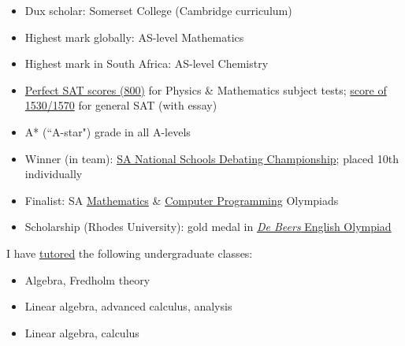 \documentclass[10pt,a4paper,ragged2e,withhyper]{altacv}
\begin{document}
\begin{paracol}{2}
\begin{itemize}
    \item Dux scholar: Somerset College (Cambridge curriculum)
    \item Highest mark globally: AS-level Mathematics
    \item Highest mark in South Africa: AS-level Chemistry
    \item \href{https://dariotrinchero.github.io/files/sat1.pdf}{Perfect SAT scores (800)} for Physics \&
		Mathematics subject tests; \href{https://dariotrinchero.github.io/files/sat2.pdf}{score of 1530/1570}
		for general SAT (with essay)
    \item A* (``A-star") grade in all A-levels
    \item Winner (in team): \href{https://sadebating.org/phalaborwa-2016/}{SA National Schools Debating Championship};
		placed 10th individually
    \item Finalist: SA \href{https://www.samf.ac.za/en/sa-mathematics-olympiad}{Mathematics}
		\& \href{https://olympiad.org.za/programming-olympiad/}{Computer Programming} Olympiads
    \item Scholarship (Rhodes University): gold medal in
		\href{https://sacee.org.za/projects/english-olympiad/}{\emph{De Beers} English Olympiad}
\end{itemize}


\switchcolumn %


\smallskip
I have \href{https://dariotrinchero.github.io/teaching/2018-math-demi}{tutored} the
following undergraduate classes:
\medskip
\begin{itemize}
\item {} Algebra, Fredholm theory
\item {} Linear algebra, advanced calculus, analysis
\item {} Linear algebra, calculus
\end{itemize}


\end{paracol}
\end{document}
